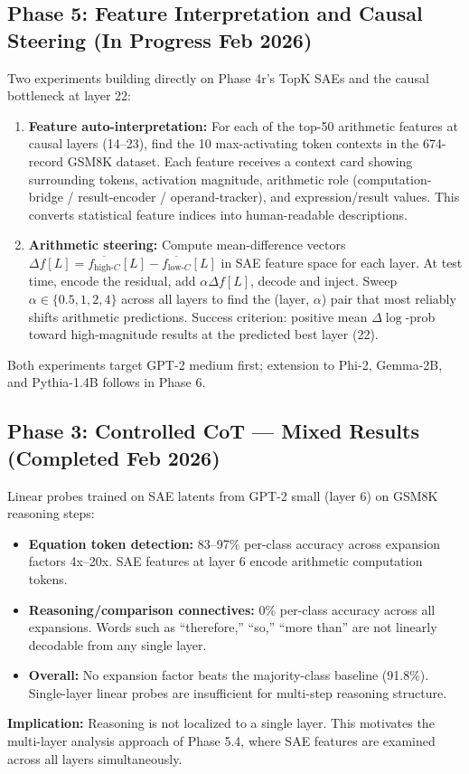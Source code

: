 \documentclass{article}
\begin{document}
\subsection{Phase 5: Feature Interpretation and Causal Steering (In Progress Feb 2026)}
Two experiments building directly on Phase 4r's TopK SAEs and the causal bottleneck at layer 22:
\begin{enumerate}
  \item \textbf{Feature auto-interpretation:} For each of the top-50 arithmetic features at causal layers (14--23), find the 10 max-activating token contexts in the 674-record GSM8K dataset.  Each feature receives a context card showing surrounding tokens, activation magnitude, arithmetic role (computation-bridge / result-encoder / operand-tracker), and expression/result values.  This converts statistical feature indices into human-readable descriptions.
  \item \textbf{Arithmetic steering:} Compute mean-difference vectors $\Delta f[L] = \overline{f_{\text{high-}C}}[L] - \overline{f_{\text{low-}C}}[L]$ in SAE feature space for each layer.  At test time, encode the residual, add $\alpha \Delta f[L]$, decode and inject.  Sweep $\alpha \in \{0.5, 1, 2, 4\}$ across all layers to find the (layer, $\alpha$) pair that most reliably shifts arithmetic predictions.  Success criterion: positive mean $\Delta\log$-prob toward high-magnitude results at the predicted best layer (22).
\end{enumerate}
Both experiments target GPT-2 medium first; extension to Phi-2, Gemma-2B, and Pythia-1.4B follows in Phase 6.

\subsection{Phase 3: Controlled CoT — Mixed Results (Completed Feb 2026)}
Linear probes trained on SAE latents from GPT-2 small (layer 6) on GSM8K reasoning steps:
\begin{itemize}
  \item \textbf{Equation token detection:} 83--97\% per-class accuracy across expansion factors 4x--20x. SAE features at layer 6 encode arithmetic computation tokens.
  \item \textbf{Reasoning/comparison connectives:} 0\% per-class accuracy across all expansions. Words such as ``therefore,'' ``so,'' ``more than'' are not linearly decodable from any single layer.
  \item \textbf{Overall:} No expansion factor beats the majority-class baseline (91.8\%). Single-layer linear probes are insufficient for multi-step reasoning structure.
\end{itemize}
\textbf{Implication:} Reasoning is not localized to a single layer. This motivates the multi-layer analysis approach of Phase 5.4, where SAE features are examined across all layers simultaneously.
\end{document}
